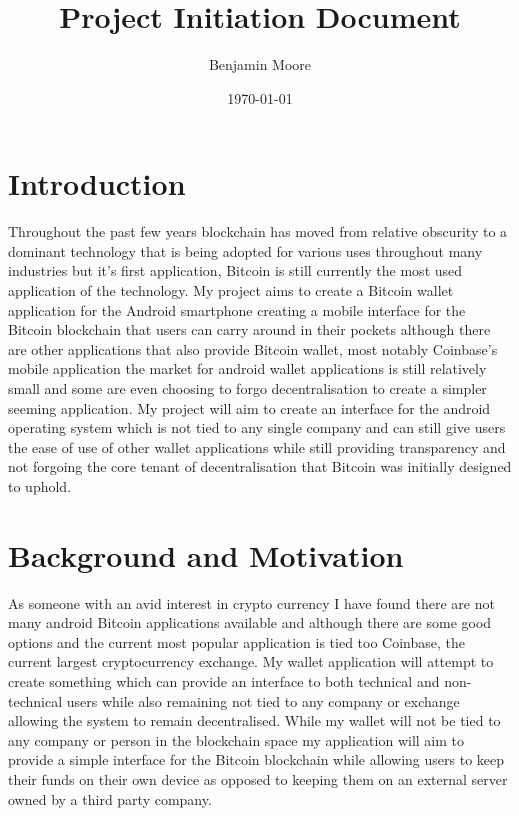 \documentclass[11pt]{article}
\author{Benjamin Moore}
\date{\today}
\title{Project Initiation Document}
\begin{document}
\maketitle

\section{Introduction}
\label{sec:orgc21b256}
Throughout the past few years blockchain has moved from relative obscurity to 
a dominant technology that is being adopted for various uses throughout many industries
but it's first application, Bitcoin is still currently the most used application of the
technology. My project aims to create a Bitcoin wallet application for the Android smartphone
creating a mobile interface for the Bitcoin blockchain that users can carry around in their pockets
although there are other applications that also provide Bitcoin wallet, most notably Coinbase's mobile
application the market for android wallet applications is still relatively small and some are even choosing 
to forgo decentralisation to create a simpler seeming application. My project will aim to create an interface 
for the android operating system which is not tied to any single company and can still give users the ease of use 
of other wallet applications while still providing transparency and not forgoing the core tenant of decentralisation
that Bitcoin was initially designed to uphold.


\section{Background and Motivation}
\label{sec:org08f0000}
As someone with an avid interest in crypto currency I have found there are not many android Bitcoin applications available 
and although there are some good options and the current most popular application is tied too Coinbase, the current largest 
cryptocurrency exchange. My wallet application will attempt to create something which can provide an interface to both technical 
and non-technical users while also remaining not tied to any company or exchange allowing the system to remain decentralised. 
While my wallet will not be tied to any company or person in the blockchain space my application will aim to provide a simple 
interface for the Bitcoin blockchain while allowing users to keep their funds on their own device as opposed to keeping them 
on an external server owned by a third party company.
\end{document}
